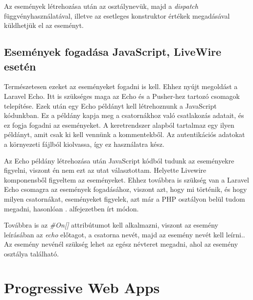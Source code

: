 \documentclass[
]{thesis-ekf}
\theoremstyle{definition}
\theoremstyle{remark}
\begin{document}


Az események létrehozása után az osztálynevük, majd a \emph{dispatch} függvényhasználatával, illetve az esetleges konstruktor értékek megadásával küldhetjük el az eseményt.



\subsection{Események fogadása JavaScript, LiveWire esetén}

Természetesen ezeket az eseményeket fogadni is kell. Ehhez nyújt megoldást a Laravel Echo\cite{broadcasting}. Itt is szükséges maga az Echo és a Pusher-hez tartozó csomagok telepítése. Ezek után egy Echo példányt kell létrehoznunk a JavaScript kódunkban. Ez a példány kapja meg a csatornákhoz való csatlakozás adatait, és ez fogja fogadni az eseményeket. A keretrendszer alapból tartalmaz egy ilyen példányt, amit csak ki kell vennünk a  kommentekből. Az autentikációs adatokat a környezeti fájlból kiolvassa, így ez használatra kész.

Az Echo példány létrehozása után JavaScript kódból tudunk az eseményekre figyelni, viszont én nem ezt az utat választottam. Helyette Livewire komponensből figyeltem az eseményeket. Ehhez továbbra is szükség van a Laravel Echo csomagra az események fogadásához, viszont azt, hogy mi történik, és hogy milyen csatornákat, eseményeket figyelek, azt már a PHP osztályon belül tudom megadni, hasonlóan . alfejezetben írt módon.

Továbbra is az \emph{\#On[]} attribútumot kell alkalmazni, viszont az esemény leírásában az \emph{echo} előtagot, a csatorna nevét, majd az esemény nevét kell leírni.\cite{livewireEcho}. Az esemény nevénél szükség lehet az egész névteret megadni, ahol az esemény osztálya található.



\section{Progressive Web Apps}
\end{document}
